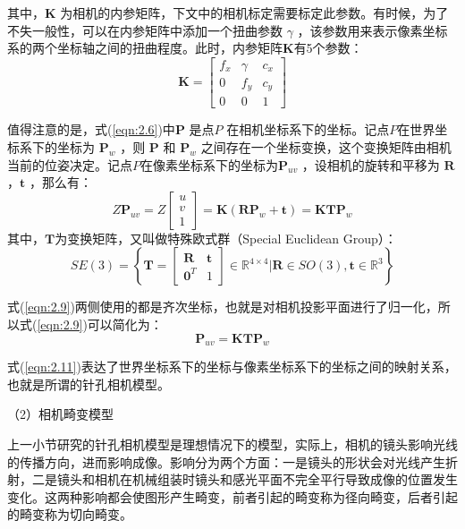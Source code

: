 其中，$\bm{K} $ 为相机的内参矩阵，下文中的相机标定需要标定此参数。有时候，为了不失一般性，可以在内参矩阵中添加一个扭曲参数 $\gamma $ ，该参数用来表示像素坐标系的两个坐标轴之间的扭曲程度。此时，内参矩阵$\bm{K} $有5个参数：
\begin{equation}
\label{eqn:2.8}
\bm{K} = \left[\begin{array}{ccc}f_x&\gamma&c_x\\0&f_y&c_y\\0&0&1\end{array}\right]
\end{equation}

值得注意的是，式(\ref{eqn:2.6})中$\bm{P} $ 是点$P $ 在相机坐标系下的坐标。记点$P $在世界坐标系下的坐标为 $\bm{P}_w $ ，则  $\bm{P} $ 和  $\bm{P}_w $ 之间存在一个坐标变换，这个变换矩阵由相机当前的位姿决定。记点$P $在像素坐标系下的坐标为$\bm{P}_{uv} $ ，设相机的旋转和平移为 $\bm{R} $ ，$\bm{t} $ ，那么有：
\begin{equation}
\label{eqn:2.9}
Z \bm{P}_{u v}=Z \left[ \begin{array}{l}{u} \\ {v} \\ {1}\end{array}\right]
=\bm{K}\left(\bm{R} \bm{P}_{w}+\bm{t}\right)=\bm{K} \bm{T} \bm{P}_{w}
\end{equation}
其中，$\bm{T} $为变换矩阵，又叫做特殊欧式群（Special Euclidean Group）：
\begin{equation}
\label{eqn:2.10}
S E(3)=\left\{
\bm{T}=\left[ \begin{array}{cc}{\bm{R}} & {\bm{t}} \\ {\bm{0}^{T}} & {1}\end{array}\right] \in \mathbb{R}^{4 \times 4} | 
\bm{R} \in S O(3), \bm{t} \in \mathbb{R}^{3}\right\} 
\end{equation}

式(\ref{eqn:2.9})两侧使用的都是齐次坐标，也就是对相机投影平面进行了归一化，所以式(\ref{eqn:2.9})可以简化为：
\begin{equation}
\label{eqn:2.11}
\boldsymbol{P}_{u v}=\boldsymbol{K} \boldsymbol{T} \boldsymbol{P}_{w}
\end{equation}

式(\ref{eqn:2.11})表达了世界坐标系下的坐标与像素坐标系下的坐标之间的映射关系，也就是所谓的针孔相机模型。

（2）相机畸变模型

上一小节研究的针孔相机模型是理想情况下的模型，实际上，相机的镜头影响光线的传播方向，进而影响成像。影响分为两个方面：一是镜头的形状会对光线产生折射，二是镜头和相机在机械组装时镜头和感光平面不完全平行导致成像的位置发生变化。这两种影响都会使图形产生畸变，前者引起的畸变称为径向畸变，后者引起的畸变称为切向畸变。

